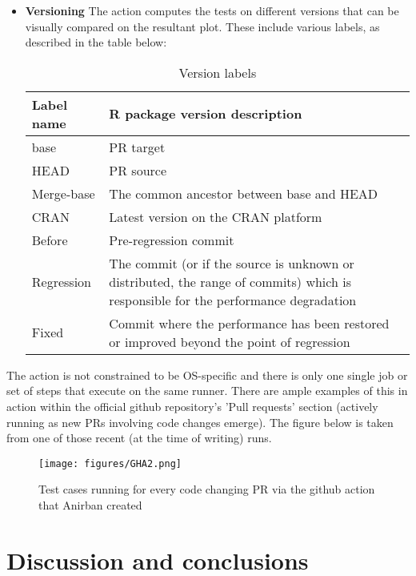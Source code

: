 \begin{itemize}
    \item \textbf{Versioning}
    \newline
    The action computes the tests on different  versions that can be visually compared on the resultant plot. These include various labels, as described in the table below:
    \begin{table}[H]
        \centering
            \caption{Version labels}
        \begin{tabular}    
        {|m{1.9cm}|m{10.8cm}|}
  \hline
  Label name & R package version description \\
  \hline
  base & PR target  \\
  \hline
  HEAD & PR source  \\
  \hline  
  Merge-base & The common ancestor between base and HEAD \\
  \hline
  CRAN & Latest version on the CRAN platform  \\
  \hline
  Before & Pre-regression commit  \\
  \hline
  Regression & The commit (or if the source is unknown or distributed, the range of commits) which is responsible for the performance degradation \\
  \hline  
   Fixed & Commit where the performance has been restored or improved beyond the point of regression \\
  \hline
    \end{tabular}
\end{table}
\end{itemize}

The action is not constrained to be OS-specific and there is only one single job or set of steps that execute on the same runner.
\newline
\newline
There are ample examples of this in action within the official  github repository's 'Pull requests' section (actively running as new PRs involving code changes emerge). The figure below is taken from one of those recent (at the time of writing) runs.

\begin{figure}[H]
    \centering
    \texttt{[image: figures/GHA2.png]}
    \caption{Test cases running for every code changing PR via the github action that Anirban created}
    \label{fig:label5}
\end{figure}


\section{Discussion and conclusions}

